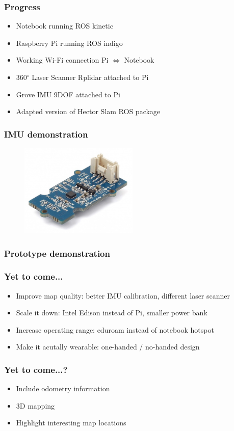 \documentclass{beamer}
\begin{document}
\begin{frame}
\frametitle{Progress}
\begin{itemize}
\item Notebook running ROS kinetic 
\pause
\item Raspberry Pi running ROS indigo 
\pause
\item Working Wi-Fi connection Pi $\Leftrightarrow$ Notebook 
\pause
\item 360$^{\circ}$ Laser Scanner Rplidar attached to Pi
\pause
\item Grove IMU 9DOF attached to Pi
\pause
\item Adapted version of Hector Slam ROS package
\end{itemize}
\end{frame}


\begin{frame}
\frametitle{IMU demonstration}
\begin{figure}
\begin{center}
\includegraphics[width=0.5\textwidth]{IMU.JPG}
\end{center}
\end{figure}
\end{frame}


\begin{frame}
\frametitle{Prototype demonstration}
\end{frame}


\begin{frame}
\frametitle{Yet to come...}
\begin{itemize}
\item Improve map quality: better IMU calibration, different laser scanner
\pause
\item Scale it down: Intel Edison instead of Pi, smaller power bank
\pause
\item Increase operating range: eduroam instead of notebook hotspot
\pause
\item Make it acutally wearable: one-handed / no-handed design
\end{itemize}
\end{frame}


\begin{frame}
\frametitle{Yet to come...?}
\begin{itemize}
\item Include odometry information
\pause
\item 3D mapping
\pause
\item Highlight interesting map locations
\end{itemize}
\end{frame}
\end{document}
